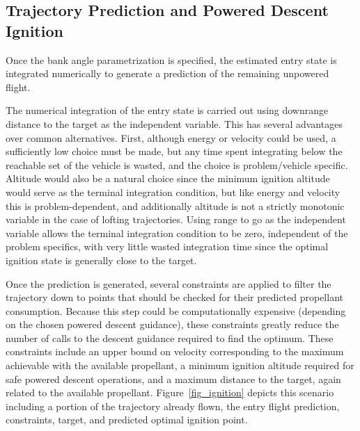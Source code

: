 \documentclass[letterpaper, preprint, paper,11pt]{AAS}
\begin{document}
\subsection{Trajectory Prediction and Powered Descent Ignition}
Once the bank angle parametrization is specified, the estimated entry state is integrated numerically to generate a prediction of the remaining unpowered flight. 

The numerical integration of the entry state is carried out using downrange distance to the target as the independent variable. This has several advantages over common alternatives. First, although energy or velocity could be used, a sufficiently low choice must be made, but any time spent integrating below the reachable set of the vehicle is wasted, and the choice is problem/vehicle specific. Altitude would also be a natural choice since the minimum ignition altitude would serve as the terminal integration condition, but like energy and velocity this is problem-dependent, and additionally altitude is not a strictly monotonic variable in the case of lofting trajectories. Using range to go as the independent variable allows the terminal integration condition to be zero, independent of the problem specifics, with very little wasted integration time since the optimal ignition state is generally close to the target. 

Once the prediction is generated, several constraints are applied to filter the trajectory down to points that should be checked for their predicted propellant consumption. Because this step could be computationally expensive (depending on the chosen powered descent guidance), these constraints greatly reduce the number of calls to the descent guidance required to find the optimum. These constraints include an upper bound on velocity corresponding to the maximum achievable with the available propellant, a minimum ignition altitude required for safe powered descent operations, and a maximum distance to the target, again related to the available propellant. Figure~\ref{fig_ignition} depicts this scenario including a portion of the trajectory already flown, the entry flight prediction, constraints, target, and predicted optimal ignition point.
\end{document}

